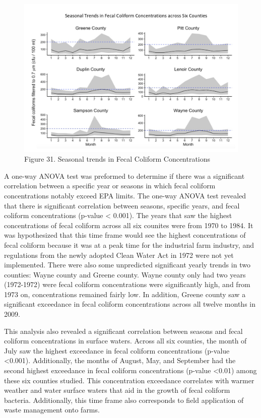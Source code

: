 \documentclass[12pt,]{article}
\begin{document}
\begin{figure}
\centering
\includegraphics{Seasonal_trends.png}
\caption{Figure 31. Seasonal trends in Fecal Coliform Concentrations}
\end{figure}

A one-way ANOVA test was preformed to determine if there was a
significant correlation between a specific year or seasons in which
fecal coliform concentrations notably exceed EPA limits. The one-way
ANOVA test revealed that there is significant correlation between
seasons, specific years, and fecal coliform concentrations (p-value
\textless{} 0.001). The years that saw the highest concentrations of
fecal coliform across all six counites were from 1970 to 1984. It was
hypothesized that this time frame would see the highest concentrations
of fecal coliform because it was at a peak time for the industrial farm
industry, and regulations from the newly adopted Clean Water Act in 1972
were not yet implemented. There were also some unpredicted significant
yearly trends in two counties: Wayne county and Greene county. Wayne
county only had two years (1972-1972) were fecal coliform concentrations
were significantly high, and from 1973 on, concentrations remained
fairly low. In addition, Greene county saw a significant exceedance in
fecal coliform concentrations across all twelve months in 2009.

This analysis also revealed a significant correlation between seasons
and fecal coliform concentrations in surface waters. Across all six
counties, the month of July saw the highest exceedance in fecal coliform
concentrations (p-value \textless{}0.001). Additionally, the months of
August, May, and September had the second highest exceedance in fecal
coliform concentrations (p-value \textless{}0.01) among these six
counties studied. This concentration exceedance correlates with warmer
weather and water surface waters that aid in the growth of fecal
coliform bacteria. Additionally, this time frame also corresponds to
field application of waste management onto farms.
\end{document}

